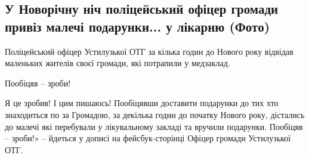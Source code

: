  
 
 
 
 
\subsection{У Новорічну ніч поліцейський офіцер громади привіз малечі подарунки... у лікарню (Фото) }
\label{sec:01_01_2022.stz.news.ua.volyn.1.novyj_god_policeman_deti_podarki}

Поліцейський офіцер Устилузької ОТГ за кілька годин до Нового року відвідав
маленьких жителів своєї громади, які потрапили у медзаклад.

\begin{zznagolos}
Пообіцяв – зроби!
\end{zznagolos}


Я це зробив! І цим пишаюсь! Пообіцявши доставити подарунки до тих хто
знаходиться по за Громадою, за декілька годин до початку Нового року, дістались
до малечі які перебували у лікувальному закладі та вручили подарунки. Пообіцяв
– зроби!» – йдеться у дописі  на фейсбук-сторінці Офіцер громади Устилузької
ОТГ.

